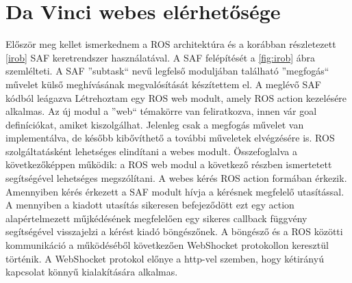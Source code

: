\documentclass[12pt,a4paper,oneside]{report} %
\begin{document}
\section{Da Vinci webes elérhetősége}
Először meg kellet ismerkednem a ROS architektúra és a korábban részletezett \ref{irob} SAF keretrendszer használatával.
A SAF felépítését a \ref{fig:irob} ábra szemlélteti. A SAF ''subtask`` nevű legfelső moduljában található ''megfogás`` művelet külső meghívásának megvalósítását készítettem el. A meglévő SAF kódból leágazva Létrehoztam egy  ROS web modult, amely ROS action kezelésére alkalmas. Az új modul a ''web`` témakörre van feliratkozva, innen vár goal definíciókat, amiket kiszolgálhat. Jelenleg csak a megfogás művelet van implementálva, de később kibővíthető a további műveletek elvégzésére is. ROS szolgáltatásként lehetséges elindítani a webes modult. Összefoglalva a következőképpen működik: a ROS web modul a következő részben ismertetett  segítségével lehetséges megszólítani. A webes kérés ROS action formában érkezik. Amennyiben kérés érkezett a SAF  modult hívja a kérésnek megfelelő utasítással. A mennyiben a kiadott utasítás sikeresen befejeződött ezt egy action alapértelmezett műjkédésének megfelelően egy sikeres callback függvény segítségével visszajelzi a kérést kiadó böngészőnek. A böngésző és a  ROS közötti kommunikáció a  működéséből következően WebShocket protokollon keresztül történik. A WebShocket protokol előnye a http-vel szemben, hogy kétirányú kapcsolat könnyű kialakítására alkalmas.
\end{document}
